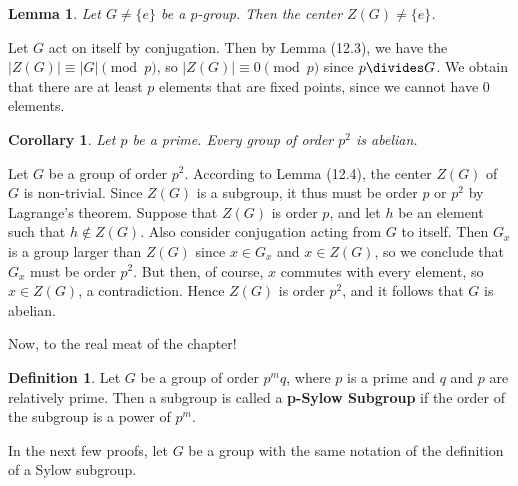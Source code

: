 \documentclass[12pt]{amsbook}
\makeatletter
\theoremstyle{plain}
\newtheorem{lemma}[theorem]{Lemma}
\newtheorem{corollary}[theorem]{Corollary}
\theoremstyle{definition}
\newtheorem{definition}{Definition}
\renewenvironment{proof}[1][\proofname]{\par
  \pushQED{\qed}%
  \normalfont \topsep6\p@\@plus6\p@\relax
  \list{}{\leftmargin=0em
          \rightmargin=\leftmargin
          \settowidth{\itemindent}{\itshape#1}%
          \labelwidth=\itemindent}

  \item[\hskip\labelsep
        \itshape
    #1\@addpunct{.}]\ignorespaces
}{%
  \popQED\endlist\@endpefalse
}
\makeatother
\begin{document}
\begin{lemma}
    Let $G \neq \{e\}$ be a $p$-group. Then the center $Z(G) \neq \{e\}$.
\end{lemma}
\begin{proof}
    Let $G$ act on itself by conjugation. Then by Lemma (12.3), we have the $|Z(G)| \equiv |G| \pmod{p}$, so $|Z(G)| \equiv 0 \pmod{p}$ since $p \divides G$. We obtain that there are at least $p$ elements that are fixed points, since we cannot have $0$ elements.
\end{proof}

\begin{corollary}
    Let $p$ be a prime. Every group of order $p^2$ is abelian.
\end{corollary}
\begin{proof}
    Let $G$ be a group of order $p^2$. According to Lemma (12.4), the center $Z(G)$ of $G$ is non-trivial. Since $Z(G)$ is a subgroup, it thus must be order $p$ or $p^2$ by Lagrange's theorem. Suppose that $Z(G)$ is order $p$, and let $h$ be an element such that $h \notin Z(G)$. Also consider conjugation acting from $G$ to itself. Then $G_x$ is a group larger than $Z(G)$ since $x \in G_x$ and $x \in Z(G)$, so we conclude that $G_x$ must be order $p^2$. But then, of course, $x$ commutes with every element, so $x \in Z(G)$, a contradiction. Hence $Z(G)$ is order $p^2$, and it follows that $G$ is abelian.
\end{proof}

Now, to the real meat of the chapter!

\begin{definition}
    Let $G$ be a group of order $p^mq$, where $p$ is a prime and $q$ and $p$ are relatively prime. Then a subgroup is called a {\bf p-Sylow Subgroup}  if the order of the subgroup is a power of $p^m$.
\end{definition}

In the next few proofs, let $G$ be a group with the same notation of the definition of a Sylow subgroup.
\end{document}
